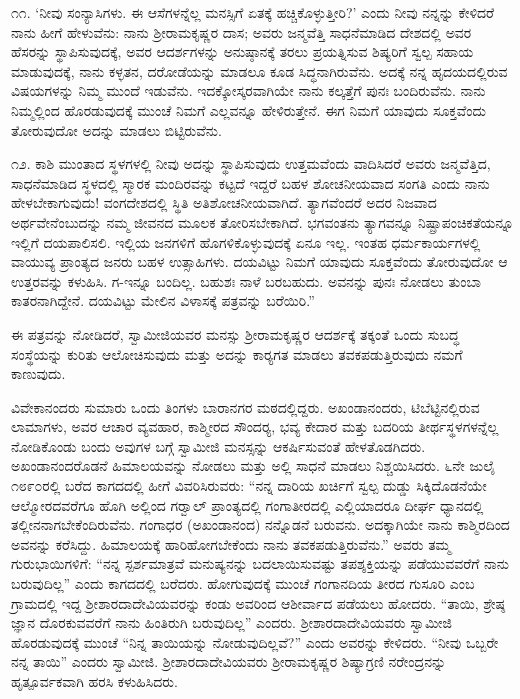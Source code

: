  ೧೧. ‘ನೀವು ಸಂನ್ಯಾಸಿಗಳು. ಈ ಆಸೆಗಳನ್ನೆಲ್ಲ ಮನಸ್ಸಿಗೆ ಏತಕ್ಕೆ ಹಚ್ಚಿಕೊಳ್ಳುತ್ತೀರಿ?’ ಎಂದು ನೀವು ನನ್ನನ್ನು ಕೇಳಿದರೆ ನಾನು ಹೀಗೆ ಹೇಳುವೆನು: ನಾನು ಶ‍್ರೀರಾಮಕೃಷ್ಣರ ದಾಸ; ಅವರು ಜನ್ಮವೆತ್ತಿ ಸಾಧನೆಮಾಡಿದ ದೇಶದಲ್ಲಿ ಅವರ ಹೆಸರನ್ನು ಸ್ಥಾಪಿಸುವುದಕ್ಕೆ, ಅವರ ಆದರ್ಶಗಳನ್ನು ಅನುಷ್ಠಾನಕ್ಕೆ ತರಲು ಪ್ರಯತ್ನಿಸುವ ಶಿಷ್ಯರಿಗೆ ಸ್ವಲ್ಪ ಸಹಾಯ ಮಾಡುವುದಕ್ಕೆ, ನಾನು ಕಳ್ಳತನ, ದರೋಡೆಯನ್ನು ಮಾಡಲೂ ಕೂಡ ಸಿದ್ಧನಾಗಿರುವೆನು. ಅದಕ್ಕೆ ನನ್ನ ಹೃದಯದಲ್ಲಿರುವ ವಿಷಯಗಳನ್ನು ನಿಮ್ಮ ಮುಂದೆ ಇಡುವೆನು. ಇದಕ್ಕೋಸ್ಕರವಾಗಿಯೇ ನಾನು ಕಲ್ಕತ್ತೆಗೆ ಪುನಃ ಬಂದಿರುವೆನು. ನಾನು ನಿಮ್ಮಲ್ಲಿಂದ ಹೊರಡುವುದಕ್ಕೆ ಮುಂಚೆ ನಿಮಗೆ ಎಲ್ಲವನ್ನೂ ಹೇಳಿರುತ್ತೇನೆ. ಈಗ ನಿಮಗೆ ಯಾವುದು ಸೂಕ್ತವೆಂದು ತೋರುವುದೋ ಅದನ್ನು ಮಾಡಲು ಬಿಟ್ಟಿರುವೆನು. 

 ೧೨. ಕಾಶಿ ಮುಂತಾದ ಸ್ಥಳಗಳಲ್ಲಿ ನೀವು ಅದನ್ನು ಸ್ಥಾಪಿಸುವುದು ಉತ್ತಮವೆಂದು ವಾದಿಸಿದರೆ ಅವರು ಜನ್ಮವೆತ್ತಿದ, ಸಾಧನೆಮಾಡಿದ ಸ್ಥಳದಲ್ಲಿ ಸ್ಮಾರಕ ಮಂದಿರವನ್ನು ಕಟ್ಟದೆ ಇದ್ದರೆ ಬಹಳ ಶೋಚನೀಯವಾದ ಸಂಗತಿ ಎಂದು ನಾನು ಹೇಳಬೇಕಾಗುವುದು! ವಂಗದೇಶದಲ್ಲಿ ಸ್ಥಿತಿ ಅತಿಶೋಚನೀಯವಾಗಿದೆ. ತ್ಯಾಗವೆಂದರೆ ಅದರ ನಿಜವಾದ ಅರ್ಥವೇನೆಂಬುದನ್ನು ನಮ್ಮ ಜೀವನದ ಮೂಲಕ ತೋರಿಸಬೇಕಾಗಿದೆ. ಭಗವಂತನು ತ್ಯಾಗವನ್ನೂ ನಿಷ್ಪ್ರಾಪಂಚಿಕತೆಯನ್ನೂ ಇಲ್ಲಿಗೆ ದಯಪಾಲಿಸಲಿ. ಇಲ್ಲಿಯ ಜನಗಳಿಗೆ ಹೊಗಳಿಕೊಳ್ಳುವುದಕ್ಕೆ ಏನೂ ಇಲ್ಲ. ಇಂತಹ ಧರ್ಮಕಾರ್ಯಗಳಲ್ಲಿ ವಾಯುವ್ಯ ಪ್ರಾಂತ್ಯದ ಜನರು ಬಹಳ ಉತ್ಸಾಹಿಗಳು. ದಯವಿಟ್ಟು ನಿಮಗೆ ಯಾವುದು ಸೂಕ್ತವೆಂದು ತೋರುವುದೋ ಆ ಉತ್ತರವನ್ನು ಕಳುಹಿಸಿ. ಗ-ಇನ್ನೂ ಬಂದಿಲ್ಲ. ಬಹುಶಃ ನಾಳೆ ಬರಬಹುದು. ಅವನನ್ನು ಪುನಃ ನೋಡಲು ತುಂಬಾ ಕಾತರನಾಗಿದ್ದೇನೆ. ದಯವಿಟ್ಟು ಮೇಲಿನ ವಿಳಾಸಕ್ಕೆ ಪತ್ರವನ್ನು ಬರೆಯಿರಿ.” 

\newpage

 ಈ ಪತ್ರವನ್ನು ನೋಡಿದರೆ, ಸ್ವಾಮೀಜಿಯವರ ಮನಸ್ಸು ಶ‍್ರೀರಾಮಕೃಷ್ಣರ ಆದರ್ಶಕ್ಕೆ ತಕ್ಕಂತೆ ಒಂದು ಸುಬದ್ಧ ಸಂಸ್ಥೆಯನ್ನು ಕುರಿತು ಆಲೋಚಿಸುವುದು ಮತ್ತು ಅದನ್ನು ಕಾರ‍್ಯಗತ ಮಾಡಲು ತವಕಪಡುತ್ತಿರುವುದು ನಮಗೆ ಕಾಣುವುದು. 

 ವಿವೇಕಾನಂದರು ಸುಮಾರು ಒಂದು ತಿಂಗಳು ಬಾರಾನಗರ ಮಠದಲ್ಲಿದ್ದರು. ಅಖಂಡಾನಂದರು, ಟಿಬೆಟ್ಟಿನಲ್ಲಿರುವ ಲಾಮಾಗಳು, ಅವರ ಆಚಾರ ವ್ಯವಹಾರ, ಕಾಶ್ಮೀರದ ಸೌಂದರ‍್ಯ, ಭವ್ಯ ಕೇದಾರ ಮತ್ತು ಬದರಿಯ ತೀರ್ಥಸ್ಥಳಗಳನ್ನೆಲ್ಲ ನೋಡಿಕೊಂಡು ಬಂದು ಅವುಗಳ ಬಗ್ಗೆ ಸ್ವಾಮೀಜಿ ಮನಸ್ಸನ್ನು ಆಕರ್ಷಿಸುವಂತೆ ಹೇಳತೊಡಗಿದರು. ಅಖಂಡಾನಂದರೊಡನೆ ಹಿಮಾಲಯವನ್ನು ನೋಡಲು ಮತ್ತು ಅಲ್ಲಿ ಸಾಧನೆ ಮಾಡಲು ನಿಶ್ಚಯಿಸಿದರು. ೬ನೇ ಜುಲೈ ೧೮೯೦ರಲ್ಲಿ ಬರೆದ ಕಾಗದದಲ್ಲಿ ಹೀಗೆ ವಿವರಿಸಿರುವರು: “ನನ್ನ ದಾರಿಯ ಖರ್ಚಿಗೆ ಸ್ವಲ್ಪ ದುಡ್ಡು ಸಿಕ್ಕಿದೊಡನೆಯೇ ಆಲ್ಮೋರದವರೆಗೂ ಹೊಗಿ ಅಲ್ಲಿಂದ ಗರ‍್ವಾಲ್ ಪ್ರಾಂತ್ಯದಲ್ಲಿ ಗಂಗಾತೀರದಲ್ಲಿ ಎಲ್ಲಿಯಾದರೂ ದೀರ್ಘ ಧ್ಯಾನದಲ್ಲಿ ತಲ್ಲೀನನಾಗಬೇಕೆಂದಿರುವೆನು. ಗಂಗಾಧರ (ಅಖಂಡಾನಂದ) ನನ್ನೊಡನೆ ಬರುವನು. ಅದಕ್ಕಾಗಿಯೇ ನಾನು ಕಾಶ್ಮಿರದಿಂದ ಅವನನ್ನು ಕರೆಸಿದ್ದು. ಹಿಮಾಲಯಕ್ಕೆ ಹಾರಿಹೋಗಬೇಕೆಂದು ನಾನು ತವಕಪಡುತ್ತಿರುವೆನು.” ಅವರು ತಮ್ಮ ಗುರುಭಾಯಿಗಳಿಗೆ: “ನನ್ನ ಸ್ಪರ್ಶಮಾತ್ರವೆ ಮನುಷ್ಯನನ್ನು ಬದಲಾಯಿಸುವಷ್ಟು ತಪಶ್ಶಕ್ತಿಯನ್ನು ಪಡೆಯುವವರೆಗೆ ನಾನು ಬರುವುದಿಲ್ಲ” ಎಂದು ಕಾಗದದಲ್ಲಿ ಬರೆದರು. ಹೋಗುವುದಕ್ಕೆ ಮುಂಚೆ ಗಂಗಾನದಿಯ ತೀರದ ಗುಸೂರಿ ಎಂಬ ಗ್ರಾಮದಲ್ಲಿ ಇದ್ದ ಶ‍್ರೀಶಾರದಾದೇವಿಯವರನ್ನು ಕಂಡು ಅವರಿಂದ ಆಶೀರ್ವಾದ ಪಡೆಯಲು ಹೋದರು. “ತಾಯಿ, ಶ್ರೇಷ್ಠ ಜ್ಞಾನ ದೊರಕುವವರೆಗೆ ನಾನು ಹಿಂತಿರುಗಿ ಬರುವುದಿಲ್ಲ” ಎಂದರು. ಶ‍್ರೀಶಾರದಾದೇವಿಯವರು ಸ್ವಾಮೀಜಿ ಹೊರಡುವುದಕ್ಕೆ ಮುಂಚೆ “ನಿನ್ನ ತಾಯಿಯನ್ನು ನೋಡುವುದಿಲ್ಲವೆ?” ಎಂದು ಅವರನ್ನು ಕೇಳಿದರು. “ನೀವು ಒಬ್ಬರೇ ನನ್ನ ತಾಯಿ” ಎಂದರು ಸ್ವಾಮೀಜಿ. ಶ‍್ರೀಶಾರದಾದೇವಿಯವರು ಶ‍್ರೀರಾಮಕೃಷ್ಣರ ಶಿಷ್ಯಾಗ್ರಣಿ ನರೇಂದ್ರನನ್ನು ಹೃತ್ಪೂರ್ವಕವಾಗಿ ಹರಸಿ ಕಳುಹಿಸಿದರು.

